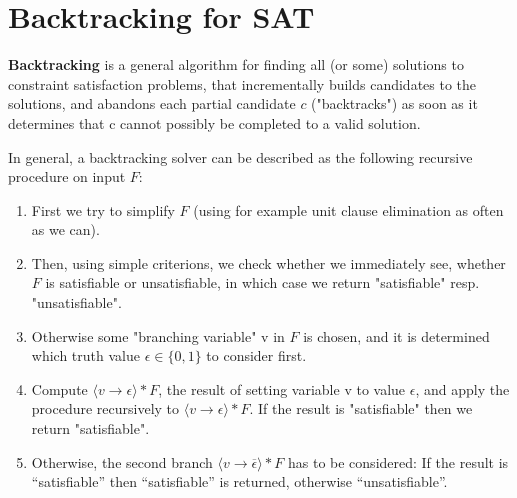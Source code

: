 \documentclass[12pt]{book}
\begin{document}
\section{Backtracking for SAT}
\label{sec:Backtracking for SAT}

\begin{defi}\label{def:bsat} \textbf{Backtracking} is a general algorithm for finding all (or some) solutions to constraint satisfaction problems, 
      that incrementally builds candidates to the solutions, and abandons each partial candidate $c$ ("backtracks") as soon as it determines that c cannot 
      possibly be completed to a valid solution. 

      In general, a backtracking solver can be described as the following recursive procedure on input $F$:
      \begin{enumerate}
            \item First we try to simplify $F$ (using for example unit clause elimination as often as we can).
            \item Then, using simple criterions, we check whether we immediately see, whether $F$ is satisfiable or
            unsatisfiable, in which case we return "satisfiable" resp. "unsatisfiable".
            \item Otherwise some "branching variable" v in $F$ is chosen, and it is determined which truth value $\epsilon \in \{ 0, 1\}$ to consider first.
            \item Compute $\langle v \to \epsilon \rangle * F$, the result of setting variable v to value $\epsilon$, and apply the procedure recursively to
            $\langle v \to \epsilon \rangle * F$. If the result is "satisfiable" then we return "satisfiable".
            \item Otherwise, the second branch $\langle v \to \overline{\epsilon} \rangle * F$ has to be considered: If the result is “satisfiable” then
            “satisfiable” is returned, otherwise “unsatisfiable”.
      \end{enumerate}
\end{defi}
\end{document}
